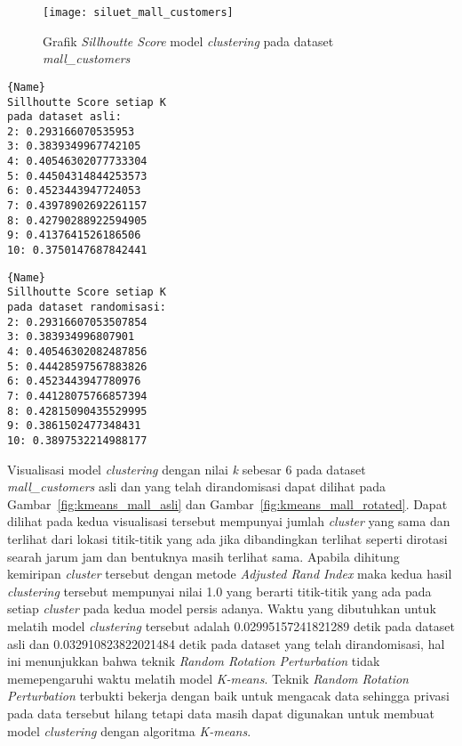 \begin{figure}
	\centering
	\texttt{[image: siluet\_mall\_customers]}
	\caption{Grafik \textit{Sillhoutte Score} model \textit{clustering} pada dataset \textit{mall\_customers}}
	\label{fig:siluet_mall_customers}
\end{figure}


\noindent\begin{minipage}{.48\textwidth}
\begin{lstlisting}[caption=Sillhoutte Score Dataset Asli,frame=tlrb, label=mall_customers_siluet_asli]{Name}
Sillhoutte Score setiap K
pada dataset asli: 
2: 0.293166070535953
3: 0.3839349967742105
4: 0.40546302077733304
5: 0.44504314844253573
6: 0.4523443947724053
7: 0.43978902692261157
8: 0.42790288922594905
9: 0.4137641526186506
10: 0.3750147687842441
\end{lstlisting}
\end{minipage}\hfill
\begin{minipage}{.48\textwidth}
\begin{lstlisting}[caption=Sillhoutte Score Dataset Randomisasi,frame=tlrb, label=mall_customers_siluet_randomisasi]{Name}
Sillhoutte Score setiap K
pada dataset randomisasi: 
2: 0.29316607053507854
3: 0.383934996807901
4: 0.40546302082487856
5: 0.44428597567883826
6: 0.4523443947780976
7: 0.44128075766857394
8: 0.42815090435529995
9: 0.3861502477348431
10: 0.3897532214988177
\end{lstlisting}
\end{minipage}

Visualisasi model \textit{clustering} dengan nilai \textit{k} sebesar 6 pada dataset \textit{mall\_customers} asli dan yang telah dirandomisasi dapat dilihat pada Gambar~\ref{fig:kmeans_mall_asli} dan Gambar~\ref{fig:kmeans_mall_rotated}. Dapat dilihat pada kedua visualisasi tersebut mempunyai jumlah \textit{cluster} yang sama dan terlihat dari lokasi titik-titik yang ada jika dibandingkan terlihat seperti dirotasi searah jarum jam dan bentuknya masih terlihat sama. Apabila dihitung kemiripan \textit{cluster} tersebut dengan metode \textit{Adjusted Rand Index} maka kedua hasil \textit{clustering} tersebut mempunyai nilai 1.0 yang berarti titik-titik yang ada pada setiap \textit{cluster} pada kedua model persis adanya. Waktu yang dibutuhkan untuk melatih model \textit{clustering} tersebut adalah 0.02995157241821289 detik pada dataset asli dan 0.032910823822021484 detik pada dataset yang telah dirandomisasi, hal ini menunjukkan bahwa teknik \textit{Random Rotation Perturbation} tidak memepengaruhi waktu melatih model \textit{K-means}. Teknik \textit{Random Rotation Perturbation} terbukti bekerja dengan baik untuk mengacak data sehingga privasi pada data tersebut hilang tetapi data masih dapat digunakan untuk membuat model \textit{clustering} dengan algoritma \textit{K-means}.

